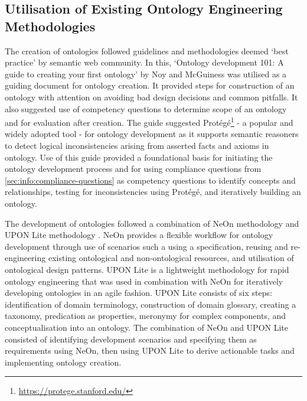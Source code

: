 \subsection{Utilisation of Existing Ontology Engineering Methodologies}
The creation of ontologies followed guidelines and methodologies deemed `best practice' by semantic web community. In this, `Ontology development 101: A guide to creating your first ontology' by Noy and McGuiness \cite{noy_ontology_2001} was utilised as a guiding document for ontology creation. It provided steps for construction of an ontology with attention on avoiding bad design decisions and common pitfalls. It also suggested use of competency questions to determine scope of an ontology and for evaluation after creation.
The guide suggested Protégé\footnote{\url{https://protege.stanford.edu/}} - a popular and widely adopted tool - for ontology development as it supports semantic reasoners to detect logical inconsistencies arising from asserted facts and axioms in ontology.
Use of this guide provided a foundational basis for initiating the ontology development process and for using compliance questions from \autoref{sec:info:compliance-questions} as competency questions to identify concepts and relationships, testing for inconsistencies using Protégé, and iteratively building an ontology. 

The development of ontologies followed a combination of NeOn methodology \cite{suarez-figueroa_neon_2012} and UPON Lite methodology \cite{de_nicola_lightweight_2016}. NeOn provides a flexible workflow for ontology development through use of scenarios such a using a specification, reusing and re-engineering existing ontological and non-ontological resources, and utilisation of ontological design patterns. 
UPON Lite is a lightweight methodology for rapid ontology engineering that was used in combination with NeOn for iteratively developing ontologies in an agile fashion. UPON Lite consists of six steps: identification of domain terminology, construction of domain glossary, creating a taxonomy, predication as properties, meronymy for complex components, and conceptualisation into an ontology.
The combination of NeOn and UPON Lite consisted of identifying development scenarios and specifying them as requirements using NeOn, then using UPON Lite to derive actionable tasks and implementing ontology creation.


